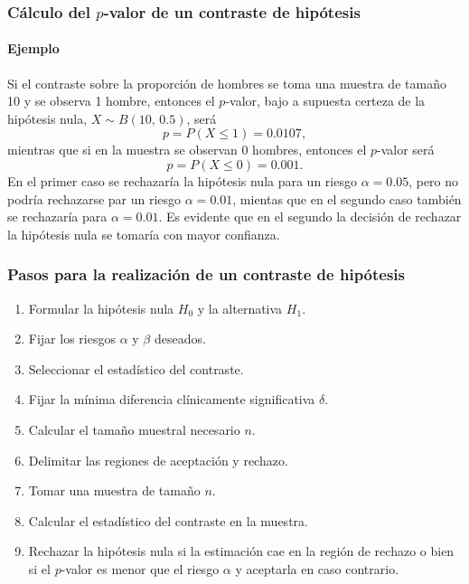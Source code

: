\begin{frame}
\frametitle{Cálculo del $p$-valor de un contraste de hipótesis}
\framesubtitle{Ejemplo}
Si el contraste sobre la proporción de hombres se toma una muestra de tamaño 10 y se observa 1 hombre, entonces el
$p$-valor, bajo a supuesta certeza de  la hipótesis nula, $X\sim B(10,\, 0.5)$, será
\[
p = P(X\leq 1)= 0.0107,
\]
mientras que si en la muestra se observan 0 hombres, entonces el $p$-valor será
\[
p = P(X\leq 0)= 0.001.
\]
En el primer caso se rechazaría la hipótesis nula para un riesgo $\alpha=0.05$, pero no podría rechazarse par un riesgo
$\alpha=0.01$, mientas que en el segundo caso también se rechazaría para $\alpha=0.01$.
Es evidente que en el segundo la decisión de rechazar la hipótesis nula se tomaría con mayor confianza.
\end{frame}


\begin{frame}
\frametitle{Pasos para la realización de un contraste de hipótesis}
\begin{enumerate}
\item Formular la hipótesis nula $H_0$ y la alternativa $H_1$.
\item Fijar los riesgos $\alpha$ y $\beta$ deseados.
\item Seleccionar el estadístico del contraste.
\item Fijar la mínima diferencia clínicamente significativa $\delta$.
\item Calcular el tamaño muestral necesario $n$.
\item Delimitar las regiones de aceptación y rechazo.
\item Tomar una muestra de tamaño $n$.
\item Calcular el estadístico del contraste en la muestra.
\item Rechazar la hipótesis nula si la estimación cae en la región de rechazo o bien si el $p$-valor es menor que el
riesgo $\alpha$ y aceptarla en caso contrario.
\end{enumerate}
\end{frame}


